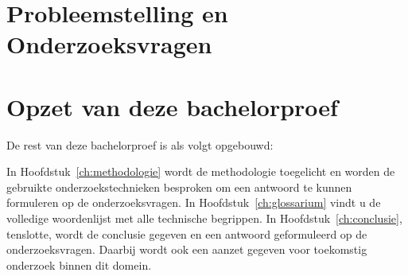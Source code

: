 \section{Probleemstelling en Onderzoeksvragen}
\label{sec:onderzoeksvragen}


\section{Opzet van deze bachelorproef}
\label{sec:opzet-bachelorproef}


De rest van deze bachelorproef is als volgt opgebouwd:

In Hoofdstuk~\ref{ch:methodologie} wordt de methodologie toegelicht en worden de gebruikte onderzoekstechnieken besproken om een antwoord te kunnen formuleren op de onderzoeksvragen.
In Hoofdstuk~\ref{ch:glossarium} vindt u de volledige woordenlijst met alle technische begrippen.
In Hoofdstuk~\ref{ch:conclusie}, tenslotte, wordt de conclusie gegeven en een antwoord geformuleerd op de onderzoeksvragen. Daarbij wordt ook een aanzet gegeven voor toekomstig onderzoek binnen dit domein.

